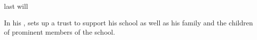 \documentclass{stex}
\begin{document}
\begin{smodule}{last will}
\begin{sparagraph}[style=symdoc]
In his ,  sets up a trust to support his school as well as his family and the children of prominent members of the school.
\end{sparagraph}
\end{smodule}
\end{document}
